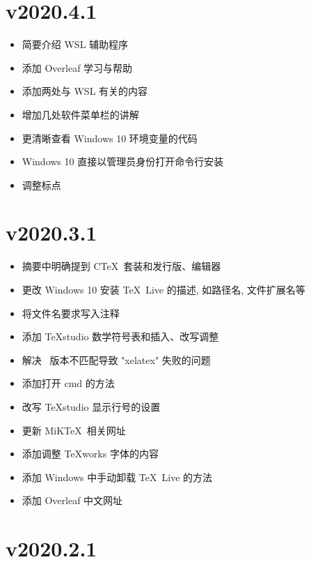 \section*{v2020.4.1}

\begin{itemize}
  \item 简要介绍 WSL 辅助程序
  \item 添加 Overleaf 学习与帮助
  \item 添加两处与 WSL 有关的内容
  \item 增加几处软件菜单栏的讲解
  \item 更清晰查看 Windows 10 环境变量的代码
  \item Windows 10 直接以管理员身份打开命令行安装
  \item 调整标点
\end{itemize}

\section*{v2020.3.1}

\begin{itemize}
    \item 摘要中明确提到 C\TeX\ 套装和发行版、编辑器
    \item 更改 Windows 10 安装 \TeX~Live 的描述, 如路径名, 文件扩展名等
    \item 将文件名要求写入注释
    \item 添加 \TeX studio 数学符号表和插入、改写调整
    \item 解决 \LaTeXe\ 版本不匹配导致 "xelatex" 失败的问题
    \item 添加打开 \textsf{cmd} 的方法
    \item 改写 \TeX studio 显示行号的设置
    \item 更新 MiK\TeX\ 相关网址
    \item 添加调整 \TeX works 字体的内容
    \item 添加 Windows 中手动卸载 \TeX~Live 的方法
    \item 添加 Overleaf 中文网址
\end{itemize}

\section*{v2020.2.1}

